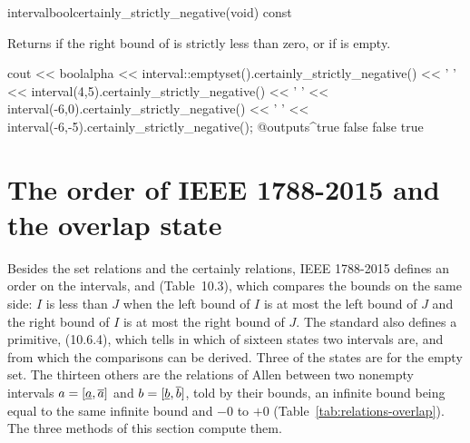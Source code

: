 \documentclass[12pt,a4paper,twoside,openright]{book}
\begin{document}
\begin{defmethod}{interval}{bool}{certainly\_strictly\_negative}{(void) const}
  \begin{operation}
    \op{$\code{self}\subseteq\left[-\infty,0\right[$}
  \end{operation}
  Returns  if the right bound of  is strictly less
  than zero, or if  is empty.
\begin{example}
cout << boolalpha << interval::emptyset().certainly_strictly_negative() << ' '
     << interval(4,5).certainly_strictly_negative() << ' '
     << interval(-6,0).certainly_strictly_negative() << ' '
     << interval(-6,-5).certainly_strictly_negative();
@outputs^true false false true~
\end{example}
\end{defmethod}

\section{The order of IEEE 1788-2015 and the overlap state}
\label{sec:relations-order}
%

Besides the set relations and the certainly relations, IEEE 1788-2015
defines an order on the intervals,  and 
(Table~10.3), which compares the bounds on the same side: $I$ is less than
$J$ when the left bound of $I$ is at most the left bound of $J$ and the right
bound of $I$ is at most the right bound of $J$. The standard also defines a
primitive,  (10.6.4), which tells in which of sixteen states
two intervals are, and from which the comparisons can be derived. Three of
the states are for the empty set. The thirteen others are the relations of
Allen between two nonempty intervals $a = [\underline{a}, \overline{a}]$
and $b = [\underline{b}, \overline{b}]$, told by their bounds, an infinite
bound being equal to the same infinite bound and $-0$ to $+0$
(Table~\ref{tab:relations-overlap}). The three methods of this section
compute them.
\end{document}

